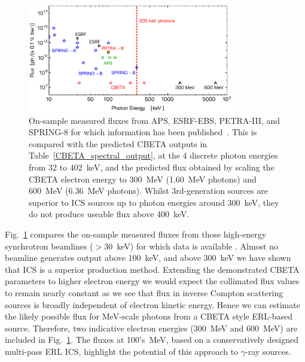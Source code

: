 \documentclass[../main.tex]{subfiles}
\begin{document}
\begin{figure}[!h]
\centering
\includegraphics[width=0.8\textwidth]{Figures/CBETA_Inverse_Compton_Source_Design/sourcefluxcomparison.pdf}
\caption{On-sample measured fluxes from APS, ESRF-EBS, PETRA-III, and SPRING-8 for which information has been published~\cite{apsbeamlines,esrfbeamlines,petraiiibeamlines,spring8beamlines}. This is compared with the predicted CBETA outputs in Table~\ref{CBETA_spectral_output}, at the 4 discrete photon energies from 32 to 402~\si{\kilo\electronvolt}, and the predicted flux obtained by scaling the CBETA electron energy to 300~\si{\mega\electronvolt} (1.60~\si{\mega\electronvolt} photons) and 600~\si{\mega\electronvolt} (6.36~\si{\mega\electronvolt} photons). Whilst 3rd-generation sources are superior to ICS sources up to photon energies around 300~\si{\kilo\electronvolt}, they do not produce useable flux above 400~\si{\kilo\electronvolt}.}
\label{fig:ICS_Undulator_Comparison}
\end{figure}

Fig.~\ref{fig:ICS_Undulator_Comparison} compares the on-sample measured fluxes from those high-energy synchrotron beamlines ($>$30~\si{\kilo\electronvolt}) for which data is available \cite{apsbeamlines,esrfbeamlines,petraiiibeamlines,spring8beamlines}. Almost no beamline generates output above 100~\si{\kilo\electronvolt}, and above 300~\si{\kilo\electronvolt} we have shown that ICS is a superior production method. Extending the demonstrated CBETA parameters to higher electron energy we would expect the collimated flux values to remain nearly constant as we see that flux in inverse Compton scattering sources is broadly independent of electron kinetic energy. Hence we can estimate the likely possible flux for \si{\mega\electronvolt}-scale photons from a CBETA style ERL-based source. Therefore, two indicative electron energies (300~\si{\mega\electronvolt} and 600~\si{\mega\electronvolt}) are included in Fig.~\ref{fig:ICS_Undulator_Comparison}. The fluxes at 100's~\si{\mega\electronvolt}, based on a conservatively designed multi-pass ERL ICS, highlight the potential of this approach to $\gamma$-ray sources. 
\end{document}
